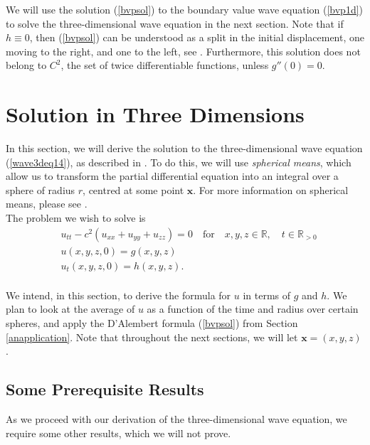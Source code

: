 \documentclass[a4paper, 12pt]{article}
\numberwithin{equation}{section}
\begin{document}
We will use the solution (\ref{bvpsol}) to the boundary value wave equation
(\ref{bvp1d}) to solve the three-dimensional wave equation in the next section.
Note that if $h \equiv 0$, then (\ref{bvpsol}) can be understood as a split in
the initial displacement, one moving to the right, and one to the left, see
\cite[Ch. 2.4.1]{Ev}. Furthermore, this solution does not belong to $C^2$, the set of twice
differentiable functions, unless $g''(0)=0$.

\section{Solution in Three Dimensions} \label{sec3d}
In this section, we will derive the solution to the three-dimensional wave
equation (\ref{wave3deq14}), as described in \cite[Chap. 2.4]{Ev}. To do this,
we will use \emph{spherical means}, which allow us to transform the partial
differential equation into an integral over a sphere of radius $r$, centred at
some point $\boldsymbol{x}$. For more information on spherical means, please
see \cite{Sab}.
\\

The problem we wish to solve is
\begin{equation} \label{3deq}
\begin{aligned}
    &u_{tt}-c^2(u_{xx}+u_{yy}+u_{zz})=0 \quad \textrm {for} \quad x, y, z \in \mathbb{R}, \quad t \in \mathbb{R}_{>0}\\
    &u(x, y, z,0)=g(x,y,z)\\
    &u_t(x,y,z,0)=h(x,y,z).\\
\end{aligned}
\end{equation}

We intend, in this section, to derive the formula for $u$ in terms of $g$ and
$h$. We plan to look at the average of $u$ as a function of the time and radius
over certain spheres, and apply the D'Alembert formula (\ref{bvpsol}) from
Section \ref{anapplication}. Note that throughout the next sections, we will let
$\boldsymbol{x}=(x,y,z)$.

\subsection{Some Prerequisite Results} \label{prereq}
As we proceed with our derivation of the three-dimensional wave equation, we require
some other results, which we will not prove. \\
\end{document}
